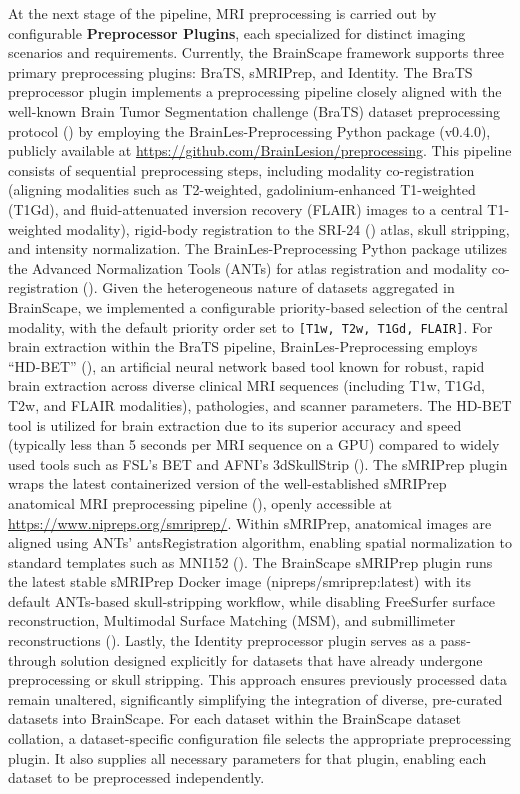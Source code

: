 At the next stage of the pipeline, MRI preprocessing is carried out by configurable \textbf{Preprocessor Plugins}, 
each specialized for distinct imaging scenarios and requirements.
Currently, the BrainScape framework supports three primary preprocessing plugins: BraTS, sMRIPrep, and Identity. 
The BraTS preprocessor plugin implements a preprocessing pipeline closely aligned with the well-known 
Brain Tumor Segmentation challenge (BraTS) dataset preprocessing protocol (\cite{menze2014multimodal}) by 
employing the BrainLes-Preprocessing Python package (v0.4.0), publicly available at \url{https://github.com/BrainLesion/preprocessing}. 
This pipeline consists of sequential preprocessing steps, including modality co-registration 
(aligning modalities such as T2-weighted, gadolinium-enhanced T1-weighted (T1Gd), and fluid-attenuated inversion recovery (FLAIR) images to a central T1-weighted modality), 
rigid-body registration to the SRI-24 (\cite{rohlfing2010sri24}) atlas, skull stripping, and intensity normalization. 
The BrainLes-Preprocessing Python package utilizes the Advanced Normalization Tools (ANTs) 
for atlas registration and modality co-registration (\cite{tustison2021antsx}). 
Given the heterogeneous nature of datasets aggregated in BrainScape, 
we implemented a configurable priority-based selection of the central modality, 
with the default priority order set to \texttt{[T1w, T2w, T1Gd, FLAIR]}. 
For brain extraction within the BraTS pipeline, BrainLes-Preprocessing employs ``HD-BET'' (\cite{isensee2019automated}), 
an artificial neural network based tool known for robust, rapid brain extraction across diverse 
clinical MRI sequences (including T1w, T1Gd, T2w, and FLAIR modalities), pathologies, and scanner parameters. 
The HD-BET tool is utilized for brain extraction due to 
its superior accuracy and speed (typically less than 5 seconds per MRI sequence on a GPU) 
compared to widely used tools such as FSL's BET and AFNI's 3dSkullStrip (\cite{isensee2019automated, smith2000bet}).
The sMRIPrep plugin wraps the latest containerized version of the well-established sMRIPrep anatomical MRI preprocessing pipeline (\cite{esteban2021smriprep}), 
openly accessible at \url{https://www.nipreps.org/smriprep/}. 
Within sMRIPrep, anatomical images are aligned using ANTs' antsRegistration algorithm, 
enabling spatial normalization to standard templates such as MNI152 (\cite{avants2008symmetric,avants2011reproducible}).
The BrainScape sMRIPrep plugin runs the latest stable sMRIPrep Docker image (nipreps/smriprep:latest) with its default ANTs-based skull-stripping workflow, 
while disabling FreeSurfer surface reconstruction, Multimodal Surface Matching (MSM), and submillimeter reconstructions 
(\cite{esteban2021smriprep}).
Lastly, the Identity preprocessor plugin serves as a pass-through solution designed explicitly for datasets that 
have already undergone preprocessing or skull stripping. 
This approach ensures previously processed data remain unaltered, significantly simplifying the integration of diverse, 
pre-curated datasets into BrainScape.
For each dataset within the BrainScape dataset collation, 
a dataset-specific configuration file selects the appropriate preprocessing plugin. 
It also supplies all necessary parameters for that plugin, 
enabling each dataset to be preprocessed independently.

